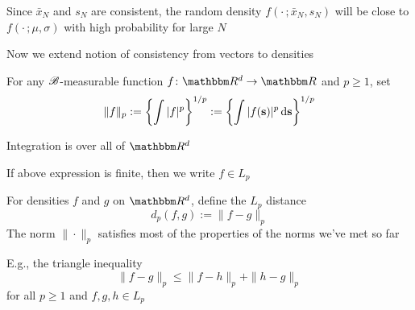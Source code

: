 \begin{frame}

    \vspace{2em}
    Since $\bar x_N$ and $s_N$ are
    consistent, the random density $f(\cdot \,; \bar x_N,
    s_N)$ will be close to $f(\cdot \,; \mu, \sigma)$ with high
    probability for large $N$
    
    \vspace{.7em}
    Now we extend notion
    of consistency from vectors to densities

    \vspace{.7em}
    For any $\mathscr B$-measurable function $f \colon \RR^d \to \RR$
    and $p \geq 1$, set
    \begin{equation}
        \label{eq:l1norm}
        \| f \|_p 
        := \left\{ \int | f |^p \right\}^{1/p}
        := \left\{ \int | f({\mathbf s}) |^p \mathop{}\!\mathrm{d}  {\mathbf s} \right\}^{1/p}
    \end{equation}
    
     Integration is over all of $\RR^d$
     
     If above expression is finite, then
    we write $f \in L_p$
    
\end{frame}


\begin{frame}
    
    \vspace{2em}
    For densities $f$ and $g$ on $\RR^d$, define the $L_p$
    distance
    \begin{equation}
        \label{eq:l1dist}
        d_p(f, g) := \| f - g \|_p 
    \end{equation}
    The norm $\| \cdot \|_p$ satisfies most of the properties of the norms we've
    met so far
    
    \vspace{.7em}
    E.g., the triangle inequality
    \begin{equation*}
        \label{eq:lptri}
        \| f - g\|_p \leq \|f - h\|_p + \| h - g \|_p
    \end{equation*}
    for all $p \geq 1$ and $f, g, h \in L_p$
    
\end{frame}

